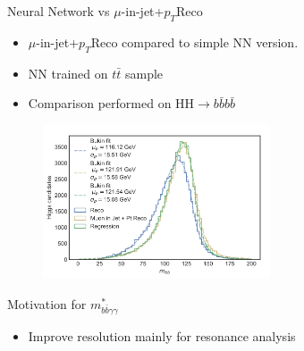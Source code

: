     

\begin{frame}{Neural Network vs $\mu$-in-jet+$p_T$Reco}

\begin{itemize}
    \item $\mu$-in-jet+$p_T$Reco compared to simple NN version. 
    \item NN trained on $t\bar{t}$ sample
    \item Comparison performed on HH$\to b\bar{b} b\bar{b}$
\end{itemize}
\begin{figure}
    \centering
    \includegraphics[width=0.6\textwidth]{BackUp/Part3/Img/4b_NN_vs_PtReco.png}
\end{figure}
\end{frame}

\begin{frame}{Motivation for $m_{b\bar{b}\gamma\gamma}^*$}
\begin{itemize}
    \item Improve resolution mainly for resonance analysis
\end{itemize}
\begin{figure}
        \centering
\end{figure}
\end{frame}

